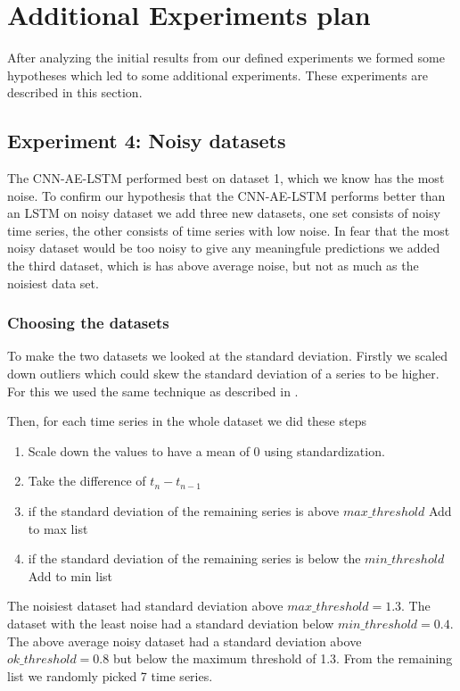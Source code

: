 
\section{Additional Experiments plan}
After analyzing the initial results from our defined experiments
we formed some hypotheses which led to some additional experiments.
These experiments are described in this section.

\subsection{Experiment 4: Noisy datasets}
The CNN-AE-LSTM performed best on dataset 1, which we know
has the most noise. To confirm our hypothesis
that the CNN-AE-LSTM performs better than an LSTM
on noisy dataset we add three new datasets,
one set consists of noisy time series,
the other consists of time series with low noise.
In fear that the most noisy dataset would be too noisy to give any meaningfule
predictions we added the third dataset, which is has above average noise, but not
as much as the noisiest data set.


\subsubsection{Choosing the datasets}
To make the two datasets we looked at the standard deviation.
Firstly we scaled down outliers which could skew the standard deviation of
a series to be higher. For this we used the same technique
as described in .

Then, for each time series in the whole dataset we did these steps
\begin{enumerate}
  \item Scale down the values to have a mean of 0 using standardization.
  \item Take the difference of $t_n - t_{n-1}$
  \item if the standard deviation of the remaining series is above $max\_threshold$ \-\> Add to max list
  \item if the standard deviation of the remaining series is below the $min\_threshold$ \-\> Add to min list
\end{enumerate}

The noisiest dataset had standard deviation above $max\_threshold = 1.3$.
The dataset with the least noise had a standard deviation below $min\_threshold = 0.4$.
The above average noisy dataset had a standard deviation above $ok\_threshold = 0.8$
but below the maximum threshold of 1.3.
From the remaining list we randomly picked 7 time series.

